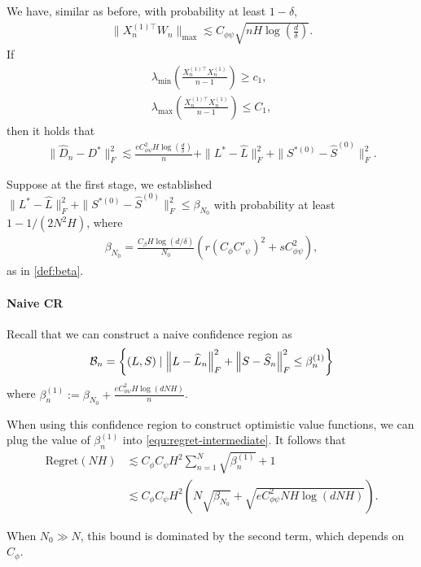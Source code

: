 We have, similar as before, with probability at least $1-\delta$,
\begin{align*}
\| 
X_n^{(1)\top}W_n
\Big\|_{\max}\lesssim C_{\phi\psi}\sqrt{nH\log\left(\frac{d}{\delta}\right)}.
\end{align*}
If 
\begin{align*}
\lambda_{\min}\left(\frac{X_n^{(1)\top} X_n^{(1)}}{n-1}\right)\ge c_1,\\
\lambda_{\max}\left(\frac{X_n^{(1)\top} X_n^{(1)}}{n-1}\right)\le C_1,
\end{align*}
then it holds that 
\begin{align*}
\|\hat D_n-D^*\|_F^2\lesssim  \frac{eC_{\phi\psi}^2H\log\left(\frac{d}{\delta}\right)}{n}+\|L^*-\hat L\|_F^2+\|S^{*(0)}-\hat S^{(0)}\|_F^2.
\end{align*}

Suppose at the first stage, we established $\|L^*-\hat L\|_F^2+\|S^{*(0)}-\hat S^{(0)}\|_F^2\le \beta_{N_0}$ with probability at least $1-1/(2N^2H)$, where \begin{align*}\beta_{N_0}=\frac{C_\beta H\log(d/\delta)}{N_0}\left(r(C_\phi C'_{\psi})^2 +sC_{\phi\psi}^2\right),
\end{align*}as in \eqref{def:beta}. 

\paragraph{Naive CR}
Recall that we can construct a naive confidence region as 
\begin{align*}
\mathcal{B}_n=\left\{(L,S) \mid \left\lVert L-\widehat L_n\right\rVert_F^2+\left\lVert S-\widehat S_n\right\rVert_F^2\leq \beta^{(1)}_n\right\}
\end{align*}
where $\beta^{(1)}_n:=\beta_{N_0}+\frac{e C_{\phi\psi}^2H\log\left(dNH\right)}{n}$.

When using this confidence region to construct optimistic value functions,
we can plug the value of $\beta_n^{(1)}$ into  \eqref{equ:regret-intermediate}. It follows that
\begin{align*}
\text{Regret}
( N  H) &\lesssim C_{\phi}C_{\psi}H^2\sum_{n=1}^{ N}\sqrt{\beta_n^{(1)}}+1\\&\lesssim C_{\phi}C_{\psi}H^2\left( N \sqrt{\beta_{N_0}}+\sqrt{e C_{\phi\psi}^2 N H\log\left(dNH\right)}\right).
\end{align*}
\begin{remark}
When $N_0\gg  N $, this bound is dominated by the second term, which depends on $C_{\phi}$. 
\end{remark}

